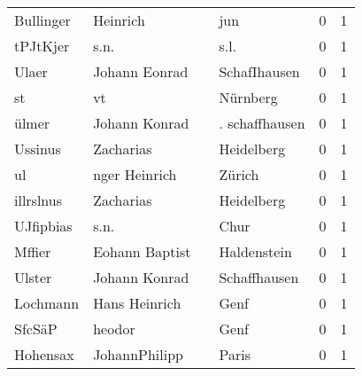 \begin{center}
\begin{tiny}
\begin{longtabu}{llllrr}
                Bullinger &                           Heinrich &             &                                         jun &          0 &         1 \\
                 tPJtKjer &                               s.n. &             &                                        s.l. &          0 &         1 \\
                    Ulaer &                      Johann Eonrad &             &                                SchafIhausen &          0 &         1 \\
                       st &                                 vt &             &                                    Nürnberg &          0 &         1 \\
                    ülmer &                      Johann Konrad &             &                              . schaffhausen &          0 &         1 \\
                  Ussinus &                          Zacharias &             &                                  Heidelberg &          0 &         1 \\
                       ul &                      nger Heinrich &             &                                      Zürich &          0 &         1 \\
                illrslnus &                          Zacharias &             &                                  Heidelberg &          0 &         1 \\
                UJfipbias &                               s.n. &             &                                        Chur &          0 &         1 \\
                   Mffier &                     Eohann Baptist &             &                                 Haldenstein &          0 &         1 \\
                   Ulster &                      Johann Konrad &             &                                Schaffhausen &          0 &         1 \\
                 Lochmann &                      Hans Heinrich &             &                                        Genf &          0 &         1 \\
                   SfcSäP &                             heodor &             &                                        Genf &          0 &         1 \\
                 Hohensax &                      JohannPhilipp &             &                                       Paris &          0 &         1 \\

\end{longtabu}
\end{tiny}
\end{center}
